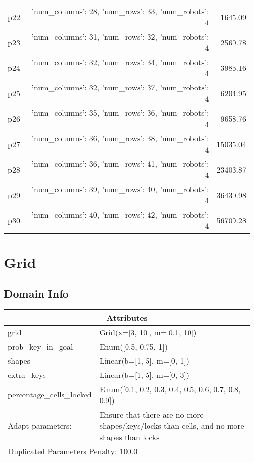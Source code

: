 \documentclass{article}
\begin{document}
\begin{center}
\begin{tabular}{@{}l|r|r@{}}
  p22&{'num\_columns': 28, 'num\_rows': 33, 'num\_robots': 4}&1645.09\\
  p23&{'num\_columns': 31, 'num\_rows': 32, 'num\_robots': 4}&2560.78\\
  p24&{'num\_columns': 32, 'num\_rows': 34, 'num\_robots': 4}&3986.16\\
  p25&{'num\_columns': 32, 'num\_rows': 37, 'num\_robots': 4}&6204.95\\
  p26&{'num\_columns': 35, 'num\_rows': 36, 'num\_robots': 4}&9658.76\\
  p27&{'num\_columns': 36, 'num\_rows': 38, 'num\_robots': 4}&15035.04\\
  p28&{'num\_columns': 36, 'num\_rows': 41, 'num\_robots': 4}&23403.87\\
  p29&{'num\_columns': 39, 'num\_rows': 40, 'num\_robots': 4}&36430.98\\
  p30&{'num\_columns': 40, 'num\_rows': 42, 'num\_robots': 4}&56709.28
                            \end{tabular}
                            \end{center}
                    
                            \newpage \section{Grid}
                    \subsection*{Domain Info}

                    \begin{center}
                    \begin{tabular}{@{}p{}p{}@{}}
                    \multicolumn{2}{c}{\bf \large Attributes}\\\midrule
                    grid & Grid(x=[3, 10], m=[0.1, 10])\\
prob\_key\_in\_goal & Enum([0.5, 0.75, 1])\\
shapes & Linear(b=[1, 5], m=[0, 1])\\
extra\_keys & Linear(b=[1, 5], m=[0, 3])\\
percentage\_cells\_locked & Enum([0.1, 0.2, 0.3, 0.4, 0.5, 0.6, 0.7, 0.8, 0.9])
                    
                    \\\midrule
                    Adapt parameters: & Ensure that there are no more shapes/keys/locks than cells, and no more shapes than locks
                
                     \\\midrule
                    \multicolumn{2}{l}{Duplicated Parameters Penalty: 100.0}
                    \end{tabular}
                    \end{center}
                
\end{document}
